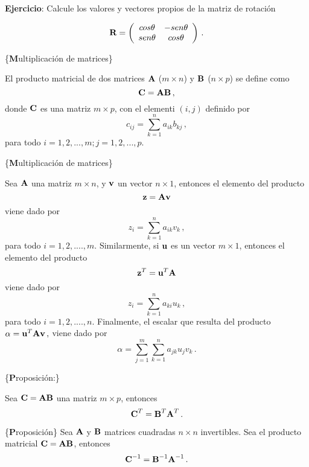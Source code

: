 \documentclass[
]{agujournal2019}
\begin{document}
\vspace{0.25cm}

\textbf{Ejercicio}: Calcule los valores y vectores propios de la matriz
de rotación

\[{\textbf R}=
\left(\begin{array}{ccccc}
  cos\theta & -sen\theta\\
  sen\theta & cos\theta\\
      \end{array}\right)\,.\]

\vspace{0.5cm}

\{\noindent \textbf Multiplicación de matrices\}

\noindent El producto matricial de dos matrices \({\textbf A}\)
(\(m\times n\)) y \({\textbf B}\) (\(n\times p\)) se define como
\[{\textbf C}={\textbf A}{\textbf B}\,,\] donde \({\textbf C}\) es una
matriz \(m\times p\), con el elementi \((i,j)\) definido por
\[c_{ij}=\sum^n_{k=1} a_{ik} b_{kj}\,,\] para todo
\(i=1,2,...,m; j=1,2,...,p\).

\vspace{0.5cm}

\{\noindent \textbf Multiplicación de matrices\}

\noindent Sea \({\textbf A}\) una matriz \(m\times n\), y
\({\textbf v}\) un vector \(n\times 1\), entonces el elemento del
producto \[{\textbf z}={\textbf A}{\textbf v}\] viene dado por
\[z_{i}=\sum^n_{k=1} a_{ik} v_{k}\,,\] para todo \(i=1,2,....,m\).
Similarmente, si \({\textbf u}\) es un vector \(m\times 1\), entonces el
elemento del producto \[{\textbf z}^T={\textbf u}^T{\textbf A}\] viene
dado por \[z_{i}=\sum^n_{k=1} a_{ki} u_{k}\,,\] para todo
\(i=1,2,....,n\). Finalmente, el escalar que resulta del producto
\(\alpha={\textbf u}^T{\textbf A}{\textbf v}\,,\) viene dado por
\[\alpha=\sum^m_{j=1}\sum^n_{k=1}a_{jk} u_j v_k\,.\]

\vspace{0.5cm}

\{\noindent \textbf Proposición:\}

\noindent Sea \({\textbf C}={\textbf A}{\textbf B}\) una matriz
\(m\times p\), entonces \[{\textbf C}^T={\textbf B}^T {\textbf A}^T\,.\]

\vspace{0.5cm}

\{\noindent \textbf Proposición\} Sea \({\textbf A}\) y \({\textbf B}\)
matrices cuadradas \(n\times n\) invertibles. \noindent Sea el producto
matricial \({\textbf C}={\textbf A}{\textbf B}\), entonces
\[{\textbf C}^{-1}={\textbf B}^{-1} {\textbf A}^{-1}\,.\]
\end{document}
